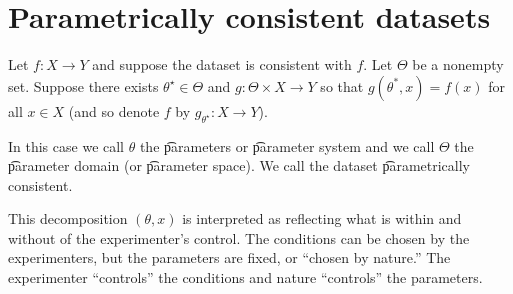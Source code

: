 \section*{Parametrically consistent datasets}

Let $f: X \to Y$ and suppose the dataset is consistent with $f$.
Let $\Theta $ be a nonempty set.
Suppose there exists $\theta ^\star \in \Theta $ and $g: \Theta \times X \to Y$ so that $g(\theta ^*, x) = f(x)$ for all $x \in X$ (and so denote $f$ by $g_{\theta ^{\star}}: X \to Y$).

In this case we call $\theta $ the \t{parameters} or \t{parameter system} and we call $\Theta $ the \t{parameter domain} (or \t{parameter space}).
We call the dataset \t{parametrically consistent}.

This decomposition $(\theta , x)$ is interpreted as reflecting what is within and without of the experimenter's control.
The conditions can be chosen by the experimenters, but the parameters are fixed, or ``chosen by nature.''
The experimenter ``controls'' the conditions and nature ``controls'' the parameters.
